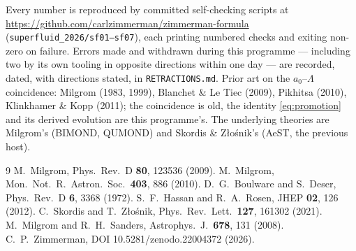 \documentclass[aps,prd,twocolumn,10pt,nofootinbib,superscriptaddress]{revtex4-2}
\begin{document}
\begin{acknowledgments}
Every number is reproduced by committed self-checking scripts at
\url{https://github.com/carlzimmerman/zimmerman-formula} (\texttt{superfluid\_2026/sf01--sf07}),
each printing numbered checks and exiting non-zero on failure. Errors made and withdrawn during
this programme --- including two by its own tooling in opposite directions within one day ---
are recorded, dated, with directions stated, in \texttt{RETRACTIONS.md}. Prior art on the
$a_0$--$\Lambda$ coincidence: Milgrom (1983, 1999), Blanchet \& Le Tiec (2009), Pikhitsa
(2010), Klinkhamer \& Kopp (2011); the coincidence is old, the identity \eqref{eq:promotion}
and its derived evolution are this programme's. The underlying theories are Milgrom's (BIMOND,
QUMOND) and Skordis \& Z\l o\'snik's (AeST, the previous host).
\end{acknowledgments}

\begin{thebibliography}{9}
 M.~Milgrom, Phys.\ Rev.\ D \textbf{80}, 123536 (2009).
 M.~Milgrom, Mon.\ Not.\ R.\ Astron.\ Soc.\ \textbf{403}, 886 (2010).
 D.~G.~Boulware and S.~Deser, Phys.\ Rev.\ D \textbf{6}, 3368 (1972).
 S.~F.~Hassan and R.~A.~Rosen, JHEP \textbf{02}, 126 (2012).
 C.~Skordis and T.~Z\l o\'snik, Phys.\ Rev.\ Lett.\ \textbf{127}, 161302 (2021).
 M.~Milgrom and R.~H.~Sanders, Astrophys.\ J.\ \textbf{678}, 131 (2008).
 C.~P.~Zimmerman, DOI 10.5281/zenodo.22004372 (2026).
\end{thebibliography}
\end{document}
